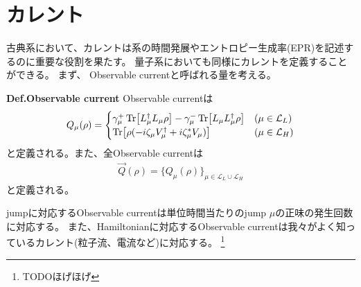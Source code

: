 \documentclass[a4paper,11pt]{jsarticle}
\numberwithin{equation}{section}
\begin{document}
\section{カレント}
古典系において、カレントは系の時間発展やエントロピー生成率(EPR)を記述するのに重要な役割を果たす。
量子系においても同様にカレントを定義することができる。
まず、
Observable currentと呼ばれる量を考える。
\begin{itembox}[l]{\textbf{Def.Observable current}}
    Observable currentは
    \begin{align}
        Q_{\mu}(\rho) =
        \begin{cases}
            \gamma_{\mu}^{+} \Tr[L_{\mu}^{\dagger} L_{\mu} \rho] - \gamma_{\mu}^{-} \Tr[L_{\mu} L_{\mu}^{\dagger} \rho] & (\mu \in \mathcal{L}_{L}) \\
            \Tr[\rho(-i\zeta_{\mu} V_{\mu}^{\dagger} + i\zeta_{\mu}^* V_{\mu})] & (\mu \in \mathcal{L}_{H})
        \end{cases}
    \end{align}
    と定義される。また、全Observable currentは
    \begin{align}
        \vec{Q}(\rho) = \{Q_{\mu}(\rho)\}_{\mu \in \mathcal{L}_{L} \cup \mathcal{L}_{H}}
    \end{align}
    と定義される。
\end{itembox}

jumpに対応するObservable currentは単位時間当たりのjump $\mu$の正味の発生回数に対応する。
また、Hamiltonianに対応するObservable currentは我々がよく知っているカレント(粒子流、電流など)に対応する。
\footnote{
    TODOほげほげ
}
\end{document}
